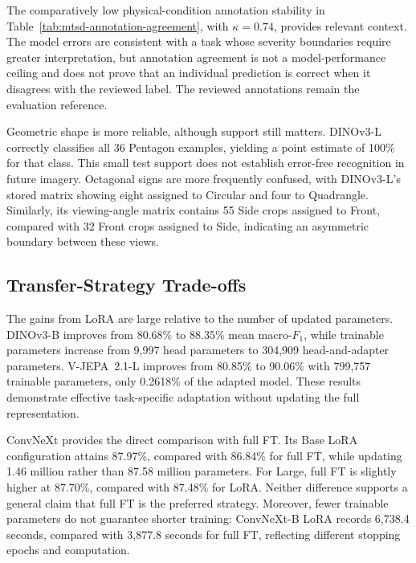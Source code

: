 The comparatively low physical-condition annotation stability in Table~\ref{tab:mtsd-annotation-agreement}, with \(\kappa=0.74\), provides relevant context. The model errors are consistent with a task whose severity boundaries require greater interpretation, but annotation agreement is not a model-performance ceiling and does not prove that an individual prediction is correct when it disagrees with the reviewed label. The reviewed annotations remain the evaluation reference.

Geometric shape is more reliable, although support still matters. DINOv3-L correctly classifies all 36 Pentagon examples, yielding a point estimate of 100\% for that class. This small test support does not establish error-free recognition in future imagery. Octagonal signs are more frequently confused, with DINOv3-L's stored matrix showing eight assigned to Circular and four to Quadrangle. Similarly, its viewing-angle matrix contains 55 Side crops assigned to Front, compared with 32 Front crops assigned to Side, indicating an asymmetric boundary between these views.


\subsection{Transfer-Strategy Trade-offs}
\label{sec:ev-transfer}
The gains from \gls{LoRA} are large relative to the number of updated parameters. DINOv3-B improves from 80.68\% to 88.35\% mean macro-\(F_1\), while trainable parameters increase from 9,997 head parameters to 304,909 head-and-adapter parameters. V-JEPA~2.1-L improves from 80.85\% to 90.06\% with 799,757 trainable parameters, only 0.2618\% of the adapted model. These results demonstrate effective task-specific adaptation without updating the full representation.

ConvNeXt provides the direct comparison with full \gls{FT}. Its Base \gls{LoRA} configuration attains 87.97\%, compared with 86.84\% for full \gls{FT}, while updating 1.46 million rather than 87.58 million parameters. For Large, full \gls{FT} is slightly higher at 87.70\%, compared with 87.48\% for \gls{LoRA}. Neither difference supports a general claim that full \gls{FT} is the preferred strategy. Moreover, fewer trainable parameters do not guarantee shorter training: ConvNeXt-B \gls{LoRA} records 6,738.4 seconds, compared with 3,877.8 seconds for full \gls{FT}, reflecting different stopping epochs and computation.

